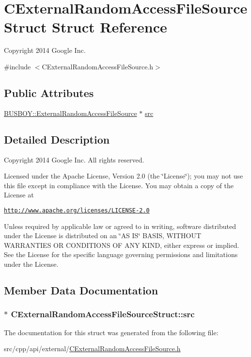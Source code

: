 \hypertarget{structCExternalRandomAccessFileSourceStruct}{
\section{CExternalRandomAccessFileSourceStruct Struct Reference}
\label{structCExternalRandomAccessFileSourceStruct}
}


Copyright 2014 Google Inc.  


{\ttfamily \#include $<$CExternalRandomAccessFileSource.h$>$}\subsection*{Public Attributes}
\begin{DoxyCompactItemize}
\item 
\hyperlink{classBUSBOY_1_1ExternalRandomAccessFileSource}{BUSBOY::ExternalRandomAccessFileSource} $\ast$ \hyperlink{structCExternalRandomAccessFileSourceStruct_a0df98fb76349ed0af14b42b588d5732b}{src}
\end{DoxyCompactItemize}


\subsection{Detailed Description}
Copyright 2014 Google Inc. All rights reserved.

Licensed under the Apache License, Version 2.0 (the \char`\"{}License\char`\"{}); you may not use this file except in compliance with the License. You may obtain a copy of the License at

\href{http://www.apache.org/licenses/LICENSE-2.0}{\tt http://www.apache.org/licenses/LICENSE-\/2.0}

Unless required by applicable law or agreed to in writing, software distributed under the License is distributed on an \char`\"{}AS IS\char`\"{} BASIS, WITHOUT WARRANTIES OR CONDITIONS OF ANY KIND, either express or implied. See the License for the specific language governing permissions and limitations under the License. 

\subsection{Member Data Documentation}
\hypertarget{structCExternalRandomAccessFileSourceStruct_a0df98fb76349ed0af14b42b588d5732b}{
\subsubsection[{src}]{$\ast$ {\bf CExternalRandomAccessFileSourceStruct::src}}}
\label{structCExternalRandomAccessFileSourceStruct_a0df98fb76349ed0af14b42b588d5732b}


The documentation for this struct was generated from the following file:\begin{DoxyCompactItemize}
\item 
src/cpp/api/external/\hyperlink{CExternalRandomAccessFileSource_8h}{CExternalRandomAccessFileSource.h}\end{DoxyCompactItemize}
